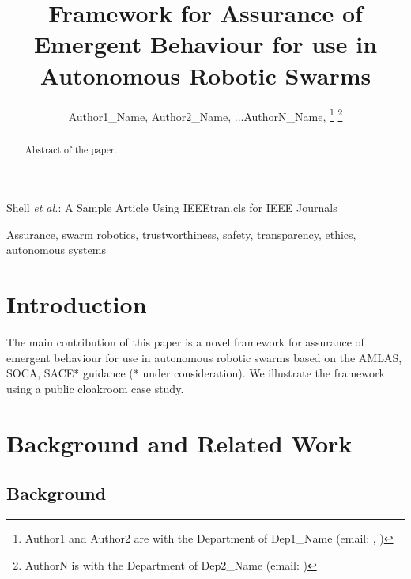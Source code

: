 \documentclass[lettersize,journal]{IEEEtran}
\begin{document}
\title{Framework for Assurance of Emergent Behaviour for use in Autonomous Robotic Swarms}

\author{Author1\_Name, Author2\_Name, ...AuthorN\_Name,
\thanks{Author1 and Author2 are with the Department of Dep1\_Name (email: , )}
\thanks{AuthorN is with the Department of Dep2\_Name (email: )}}
%
{Shell \MakeLowercase{\textit{et al.}}: A Sample Article Using IEEEtran.cls for IEEE Journals}


\maketitle

\begin{abstract}
	Abstract of the paper.
\end{abstract}

\begin{IEEEkeywords}
	Assurance, swarm robotics, trustworthiness, safety, transparency, ethics, autonomous systems
\end{IEEEkeywords}

\section{Introduction}\label{introduction}
The main contribution of this paper is a novel framework for assurance of emergent behaviour for use in autonomous robotic swarms based on the AMLAS, SOCA, SACE* guidance (* under consideration). We illustrate the framework using a public cloakroom case study. 



\section{Background and Related Work}\label{background-relatedwork}

\subsection{Background}\label{background}
\end{document}
